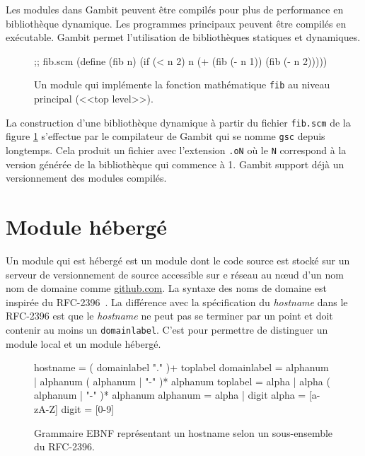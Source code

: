Les modules dans Gambit peuvent être compilés pour plus de performance en
bibliothèque dynamique. Les programmes principaux peuvent être compilés en
exécutable.  Gambit permet l'utilisation de bibliothèques statiques et
dynamiques.\\

\begin{figure}[ht]
  \centering

  \begin{mplisting}{0.5}
;; fib.scm
(define (fib n)
  (if (< n 2)
      n
      (+ (fib (- n 1))
         (fib (- n 2)))))
\end{mplisting}
  \caption{Un module qui implémente la fonction mathématique \texttt{fib}
    au niveau principal (<<top level>>).}
  \label{fig:basic_fib_module}
\end{figure}

La construction d'une bibliothèque dynamique à partir du fichier
\texttt{fib.scm} de la figure \ref{fig:basic_fib_module} s'effectue par le
compilateur de Gambit qui se nomme \texttt{gsc} depuis longtemps. Cela produit
un fichier avec l'extension \texttt{.oN} où le \texttt{N} correspond à la
version générée de la bibliothèque qui commence à 1. Gambit support
déjà un versionnement des modules compilés.


\section{Module hébergé}

Un module qui est hébergé est un module dont le code source est stocké sur un
serveur de versionnement de source accessible sur e réseau au nœud d'un nom nom
de domaine comme \url{github.com}. La syntaxe des noms de domaine est inspirée
du RFC-2396~\cite{RFC:URI-2396}.  La différence avec la spécification du
\textit{hostname} dans le RFC-2396 est que le \textit{hostname} ne peut pas se
terminer par un point et doit contenir au moins un \verb|domainlabel|. C'est
pour permettre de distinguer un module local et un module hébergé. \\

\begin{figure}[ht]
  \centering
  \lstset{frame=single}
  \begin{mplisting}{0.9}
hostname      = ( domainlabel "." )+ toplabel
domainlabel   = alphanum | alphanum ( alphanum | "-" )* alphanum
toplabel      = alpha | alpha ( alphanum | "-" )* alphanum
alphanum      = alpha | digit
alpha         = [a-zA-Z]
digit         = [0-9]
\end{mplisting}
  \caption{Grammaire EBNF représentant un hostname selon un sous-ensemble du
  RFC-2396.}
  \label{fig:hostname->grammar}
\end{figure}


